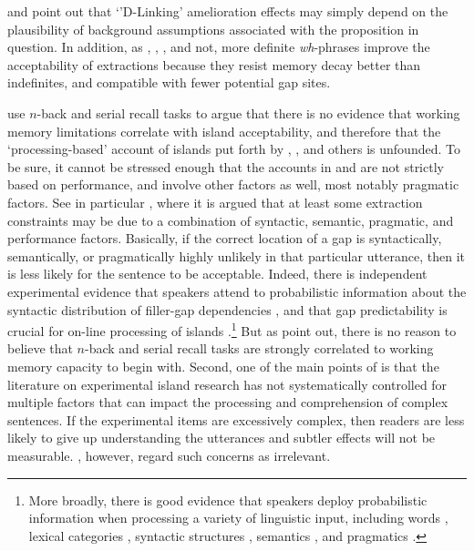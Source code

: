\documentclass[output=paper]{langsci/langscibook}
\begin{document}
 \citet{kroch89} and \citet[270]{levhubook} point out that `'D-Linking' amelioration effects  may simply depend on the plausibility of background assumptions associated with the proposition in question. In addition, as \citet{kluenderkustas}, \citet{saghof}, \citet{philcls}, \citet{philipt07} and \citet{hofsaglang} not,  more definite {\it wh}-phrases improve the  acceptability of  extractions because they resist memory decay better than indefinites, and compatible with fewer potential gap sites. 

 
  \citet{sprouse12} use $n$-back and serial recall tasks to argue that there is no evidence that working
  memory limitations correlate with island acceptability, and therefore that the `processing-based'
  account of islands put forth by  \citet{kluender92,kluender}, \citet{kluenderkustas}, \citep{hofsaglang} and others is unfounded. To be sure, it cannot be stressed enough that the accounts in \citet{kluender92} and \citep{hofsaglang} are  not strictly based on performance, and involve other factors as well, most notably pragmatic factors. See in particular \citet[49]{hoflangreply}, where it is argued that at least some extraction constraints may be due to a combination of syntactic, semantic, pragmatic, and performance factors.  Basically, if the correct location of a gap is syntactically, semantically, or pragmatically highly unlikely in that particular utterance, then it is less likely for the sentence to be acceptable.  Indeed, there is independent experimental evidence that  speakers attend to  probabilistic information about the syntactic distribution of  filler-gap dependencies \citep{culcogsci},  and that gap  predictability  is crucial for on-line processing of islands \citep{michelt}.\footnote{More broadly, there is good  evidence that  speakers deploy probabilistic information when  processing a variety of linguistic input, including words \citep{altman99,arai,creel,delong,kutas84},  lexical categories \citep{gibson07,levy13,tabor97},  syntactic structures \citep{levyted,lau06,levy08,staub},  semantics \citep{altman99,federmeier,kamide03}, and pragmatics \citep{shankweiler,mak,roland12}.} But as \citet{reply2} point out, there is no reason to believe  that $n$-back and serial recall tasks are strongly correlated to working memory capacity to begin with. Second, one of the main points of \citep{hofsaglang} is that the literature  on experimental  island research has not systematically controlled for multiple factors that can impact the processing and comprehension of complex sentences. If the experimental items are excessively  complex, then readers are less likely to give up understanding the utterances and subtler effects  will not be measurable.  \citet{phil13}, however, regard such concerns as irrelevant.
  
\end{document}
